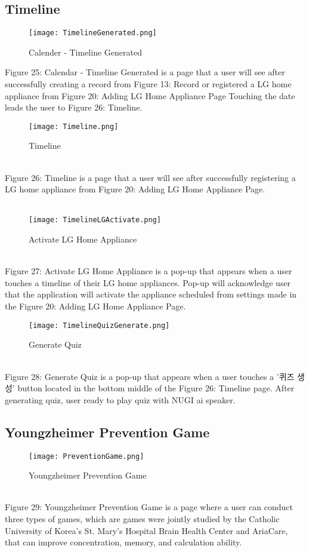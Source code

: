 \documentclass[conference]{IEEEtran}
\begin{document}
\subsection{Timeline}
\begin{figure}[h]
\centerline{\texttt{[image: TimelineGenerated.png]}}
\caption{Calender - Timeline Generated}
\label{fig}
\end{figure}
Figure 25: Calendar - Timeline Generated is a page that a user will see after successfully creating a record from Figure 13: Record or registered a LG home appliance from Figure 20: Adding LG Home Appliance Page Touching the date leads the user to Figure 26: Timeline.
\\
\begin{figure}[h]
\centerline{\texttt{[image: Timeline.png]}}
\caption{Timeline}
\label{fig}
\end{figure}
\\
Figure 26: Timeline is a page that a user will see after successfully registering a LG home appliance from Figure 20: Adding LG Home Appliance Page.
\\\\
\begin{figure}[h]
\centerline{\texttt{[image: TimelineLGActivate.png]}}
\caption{Activate LG Home Appliance}
\label{fig}
\end{figure}
\\
Figure 27: Activate LG Home Appliance is a pop-up that appears when a user touches a timeline of their LG home appliances. Pop-up will acknowledge user that the application will activate the appliance scheduled from settings made in the Figure 20: Adding LG Home Appliance Page.
\\
\begin{figure}[h]
\centerline{\texttt{[image: TimelineQuizGenerate.png]}}
\caption{Generate Quiz}
\label{fig}
\end{figure}
\\
Figure 28: Generate Quiz is a pop-up that appears when a user touches a '퀴즈 생성' button located in the bottom middle of the Figure 26: Timeline page. After generating quiz, user ready to play quiz with NUGI ai speaker.
\\
\clearpage
\subsection{Youngzheimer Prevention Game}
\begin{figure}[h]
\centerline{\texttt{[image: PreventionGame.png]}}
\caption{Youngzheimer Prevention Game}
\label{fig}
\end{figure}
\\
Figure 29: Youngzheimer Prevention Game is a page where a user can conduct three types of games, which are games were jointly studied by the Catholic University of Korea's St. Mary's Hospital Brain Health Center and AriaCare, that can improve concentration, memory, and calculation ability.\\
\end{document}
